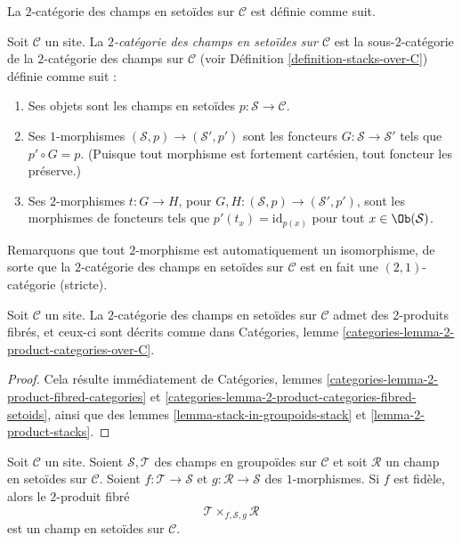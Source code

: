 \noindent
La $2$-catégorie des champs en setoïdes sur $\mathcal{C}$
est définie comme suit.

\begin{definition}
\label{definition-stacks-in-setoids-over-C}
Soit $\mathcal{C}$ un site.
La {\it $2$-catégorie des champs en setoïdes sur $\mathcal{C}$}
est la sous-$2$-catégorie de la $2$-catégorie des champs
sur $\mathcal{C}$ (voir Définition \ref{definition-stacks-over-C})
définie comme suit :
\begin{enumerate}
\item Ses objets sont les champs en setoïdes
$p : \mathcal{S} \to \mathcal{C}$.
\item Ses $1$-morphismes $(\mathcal{S}, p) \to (\mathcal{S}', p')$
sont les foncteurs $G : \mathcal{S} \to \mathcal{S}'$ tels que
$p' \circ G = p$. (Puisque tout morphisme est fortement cartésien,
tout foncteur les préserve.)
\item Ses $2$-morphismes $t : G \to H$, pour
$G, H : (\mathcal{S}, p) \to (\mathcal{S}', p')$,
sont les morphismes de foncteurs
tels que $p'(t_x) = \text{id}_{p(x)}$
pour tout $x \in \Ob(\mathcal{S})$.
\end{enumerate}
\end{definition}

\noindent
Remarquons que tout $2$-morphisme est automatiquement un isomorphisme, de sorte
que la $2$-catégorie des champs en setoïdes sur $\mathcal{C}$
est en fait une $(2, 1)$-catégorie (stricte).

\begin{lemma}
\label{lemma-2-product-stacks-in-setoids}
Soit $\mathcal{C}$ un site.
La $2$-catégorie des champs en setoïdes sur $\mathcal{C}$
admet des 2-produits fibrés, et ceux-ci sont décrits comme dans
Catégories, lemme \ref{categories-lemma-2-product-categories-over-C}.
\end{lemma}

\begin{proof}
Cela résulte immédiatement de
Catégories, lemmes \ref{categories-lemma-2-product-fibred-categories} et
\ref{categories-lemma-2-product-categories-fibred-setoids},
ainsi que des
lemmes \ref{lemma-stack-in-groupoids-stack} et
\ref{lemma-2-product-stacks}.
\end{proof}

\begin{lemma}
\label{lemma-2-fibre-product-gives-stack-in-setoids}
Soit $\mathcal{C}$ un site.
Soient $\mathcal{S}, \mathcal{T}$ des champs en groupoïdes sur $\mathcal{C}$
et soit $\mathcal{R}$ un champ en setoïdes sur $\mathcal{C}$.
Soient $f : \mathcal{T} \to \mathcal{S}$ et $g : \mathcal{R} \to \mathcal{S}$
des $1$-morphismes. Si $f$ est fidèle, alors le $2$-produit fibré
$$
\mathcal{T} \times_{f, \mathcal{S}, g} \mathcal{R}
$$
est un champ en setoïdes sur $\mathcal{C}$.
\end{lemma}

